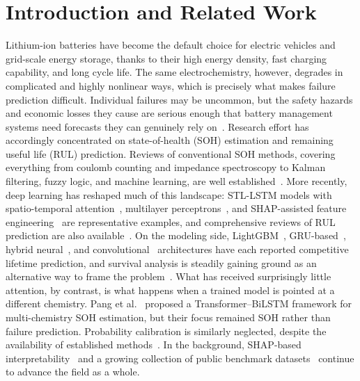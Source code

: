 \documentclass[conference]{IEEEtran}
\begin{document}
\section{Introduction and Related Work}
Lithium-ion batteries have become the default choice for electric
vehicles and grid-scale energy storage, thanks to their high energy
density, fast charging capability, and long cycle life. The same
electrochemistry, however, degrades in complicated and highly
nonlinear ways, which is precisely what makes failure prediction
difficult. Individual failures may be uncommon, but the safety hazards
and economic losses they cause are serious enough that battery
management systems need forecasts they can genuinely rely
on~\cite{berecibar2016}. Research effort has accordingly concentrated
on state-of-health (SOH) estimation and remaining useful life (RUL)
prediction. Reviews of conventional SOH methods, covering everything
from coulomb counting and impedance spectroscopy to Kalman filtering,
fuzzy logic, and machine learning, are well established~\cite{berecibar2016}.
More recently, deep learning has reshaped much of this landscape:
STL-LSTM models with spatio-temporal attention~\cite{xu2024},
multilayer perceptrons~\cite{bairwa2025}, and SHAP-assisted feature
engineering~\cite{tetik2026} are representative examples, and
comprehensive reviews of RUL prediction are also
available~\cite{jin2021,li2026,thelen2024}. On the modeling side,
LightGBM~\cite{li2026lightgbm}, GRU-based~\cite{wang2021}, hybrid
neural~\cite{rastegarpanah2024}, and convolutional~\cite{sun2025}
architectures have each reported competitive lifetime prediction, and
survival analysis is steadily gaining ground as an alternative way to
frame the problem~\cite{ibraheem2025,li2024,yao2024}. What has
received surprisingly little attention, by contrast, is what happens
when a trained model is pointed at a different chemistry. Pang et
al.~\cite{pang2026} proposed a Transformer--BiLSTM framework for
multi-chemistry SOH estimation, but their focus remained SOH rather
than failure prediction. Probability calibration is similarly
neglected, despite the availability of established
methods~\cite{platt1999,zadrozny2002,goldstein2020}. In the
background, SHAP-based interpretability~\cite{lundberg2017} and a
growing collection of public benchmark datasets~\cite{dosreis2021,li2025}
continue to advance the field as a whole.
\end{document}
